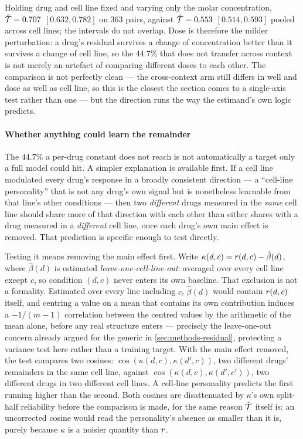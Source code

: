 Holding drug and cell line fixed and varying only the molar concentration,
$\hat{\mathcal{T}} = 0.707$ $[0.632, 0.782]$ on $\num{363}$ pairs, against
$\hat{\mathcal{T}} = 0.553$ $[0.514, 0.593]$ pooled across cell lines; the intervals
do not overlap. Dose is therefore the milder perturbation: a drug's residual
survives a change of concentration better than it survives a change of cell
line, so the $44.7\%$ that does not transfer across context is not merely an
artefact of comparing different doses to each other. The comparison is not
perfectly clean --- the cross-context arm still differs in well and dose as well
as cell line, so this is the closest the section comes to a single-axis test
rather than one --- but the direction runs the way the estimand's own logic
predicts.


 
\paragraph{Whether anything could learn the remainder} The $44.7\%$ a per-drug
constant does not reach is not automatically a target only a full model could
hit. A simpler explanation is available first. If a cell line modulated every
drug's response in a broadly consistent direction --- a ``cell-line
personality'' that is not any drug's own signal but is nonetheless learnable
from that line's other conditions --- then two \emph{different} drugs measured
in the \emph{same} cell line should share more of that direction with each
other than either shares with a drug measured in a \emph{different} cell line,
once each drug's own main effect is removed. That prediction is specific enough
to test directly.

Testing it means removing the main effect first. Write
$\kappa(d,c) = r(d,c) - \hat{\beta}(d)$, where $\hat\beta(d)$ is estimated
\emph{leave-one-cell-line-out}: averaged over every cell line except $c$, so
condition $(d,c)$ never enters its own baseline. That exclusion is not a
formality. Estimated over every line including $c$, $\hat\beta(d)$ would
contain $r(d,c)$ itself, and centring a value on a mean that contains its
own contribution induces a $-1/(m-1)$ correlation between the centred values by
the arithmetic of the mean alone, before any real structure enters ---
precisely the leave-one-out concern already argued for the generic in
\cref{sec:methods-residual}, protecting a variance test here rather than a
training target. With the main effect removed, the test compares two cosines:
$\cos(\kappa(d,c), \kappa(d',c))$, two different drugs' remainders in the same
cell line, against $\cos(\kappa(d,c), \kappa(d',c'))$, two different drugs in
two different cell lines. A cell-line personality predicts the first running
higher than the second. Both cosines are disattenuated by $\kappa$'s own
split-half reliability before the comparison is made, for the same reason
$\hat{\mathcal{T}}$ itself is: an uncorrected cosine would read the personality's
absence as smaller than it is, purely because $\kappa$ is a noisier quantity
than $r$.

